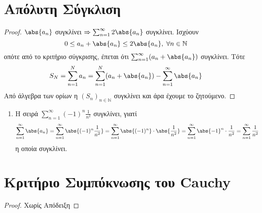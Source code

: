 \documentclass[main.tex]{subfiles}
\begin{document}
\section{Απόλυτη Σύγκλιση}


\begin{proof}
    $ \abs{a_{n}} $ συγκλίνει $ \Rightarrow \sum_{n=1}^{\infty} 2 \abs{a_{n}} $ 
    συγκλίνει. Ισχύουν
    \[
        0 \leq a_{n} + \abs{a_{n}} \leq 2 \abs{a_{n}}, \; \forall n \in \mathbb{N} 
    \] 
    οπότε από το κριτήριο σύγκρισης, έπεται ότι $ \sum_{n=1}^{\infty} (a_{n}+ 
    \abs{a_{n}}) $ συγκλίνει. Τότε
    \[
        S_{N} = \sum_{n=1}^{N} a_{n} = \sum_{n=1}^{N} (a_{n}+ \abs{a_{n}}) - 
        \sum_{n=1}^{\infty} \abs{a_{n}}   
    \] 
    Από άλγεβρα των ορίων η $ {(S_{n})}_{n \in \mathbb{N}} $ συγκλίνει και άρα 
    έχουμε το ζητούμενο.
\end{proof}

\begin{examples}
\item {}
    \begin{enumerate}
        \item Η σειρά $ \sum_{n=1}^{\infty} (-1)^{n} \frac{1}{n^{2}} $ συγκλίνει, 
            γιατί 
            \[ 
                \sum_{n=1}^{\infty} \abs{a_{n}} = \sum_{n=1}^{\infty} \abs{(-1)^{n}
                \frac{1}{n^{2}}} = \sum_{n=1}^{\infty} \abs{(-1)^{n}} 
                \cdot \abs{\frac{1}{n^{2}} } =  
                \sum_{n=1}^{\infty} \abs{-1}^{n} \cdot 
                \frac{1}{n^{2}} = \sum_{n=1}^{\infty} \frac{1}{n^{2}} 
            \]
            η οποία συγκλίνει.
    \end{enumerate}
\end{examples}

\section{Κριτήριο Συμπύκνωσης του Cauchy}


\begin{proof}
    Χωρίς Απόδειξη
\end{proof}
\end{document}
